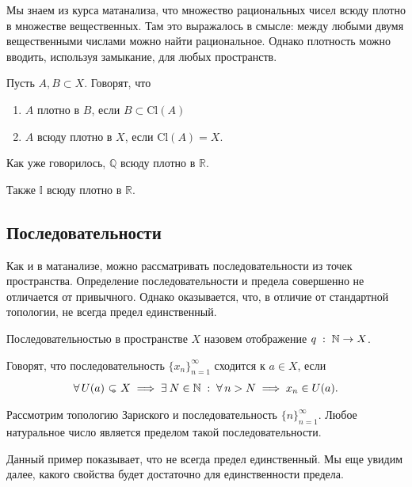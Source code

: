     Мы знаем из курса матанализа, что множество рациональных чисел всюду плотно в множестве вещественных. Там это выражалось в смысле: между любыми двумя вещественными числами можно найти рациональное. Однако плотность можно вводить, используя замыкание, для любых пространств.
    \begin{Def}
        Пусть $A, B \subset X$. Говорят, что
        \begin{enumerate}
            \item $A$ плотно в $B$, если $B \subset \mathrm{Cl}(A)$
            \item $A$ всюду плотно в $X$, если $\mathrm{Cl}(A) = X$.
        \end{enumerate}
    \end{Def}
    \begin{Ex}
        Как уже говорилось, $\mathbb{Q}$ всюду плотно в $\mathbb{R}$.

        Также $\mathbb{I}$ всюду плотно в $\mathbb{R}$. 
    \end{Ex}

    \subsection{Последовательности}
    Как и в матанализе, можно рассматривать последовательности из точек пространства. Определение последовательности и предела совершенно не отличается от привычного. Однако оказывается, что, в отличие от стандартной топологии, не всегда предел единственный.
    \begin{Def}
        [Последовательность]
        Последовательностью в пространстве $X$ назовем отображение $q\; : \; \mathbb{N} \to X$.
    \end{Def}
    \begin{Def}
        Говорят, что последовательность $\{x_n\}_{n=1}^\infty$ сходится к $a \in X$, если \[
            \forall U(a) \open X \implies \exists N \in \mathbb{N} \st \forall n > N \implies x_n \in U(a).
        \] 
    \end{Def}
    \begin{Ex}
        Рассмотрим топологию Зариского и последовательность $\{n\}_{n=1}^\infty$. Любое натуральное число является пределом такой последовательности.
    \end{Ex}
    Данный пример показывает, что не всегда предел единственный. Мы еще увидим далее, какого свойства будет достаточно для единственности предела. 
